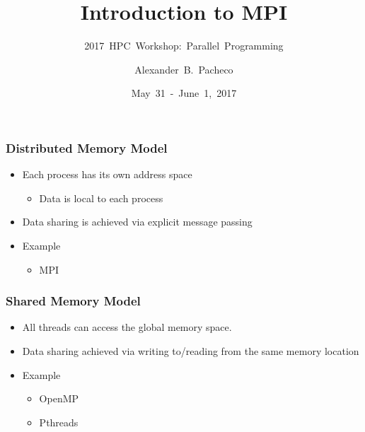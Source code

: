 \documentclass[10pt,t]{beamer}
\title{Introduction to MPI}
\subtitle{2017~HPC~Workshop:~Parallel~Programming}
\author{\large{Alexander~B.~Pacheco}}
\institute{\href{http://researchcomputing.lehigh.edu}{LTS Research Computing}}
\date{May~31~-~June~1,~2017}
\begin{document}
\begin{frame}
  \titlepage
\end{frame}

\scriptsize
\begin{frame}
  \frametitle{Distributed Memory Model}
    \begin{itemize}
      \item Each process has its own address space
      \begin{itemize}
        \item Data is local to each process
      \end{itemize}
      \item Data sharing is achieved via explicit message passing
      \item Example
      \begin{itemize}
        \item MPI
      \end{itemize}
    \end{itemize}

    
\end{frame}

\begin{frame}
  \frametitle{Shared Memory Model}
    \begin{itemize}
      \item All threads can access the global memory space.
      \item Data sharing achieved via writing to/reading from the same memory location
      \item Example
      \begin{itemize}
        \item OpenMP
        \item Pthreads
      \end{itemize}
    \end{itemize}
    
\end{frame}
\end{document}
